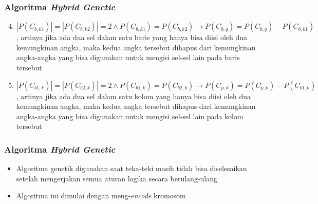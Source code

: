 \documentclass{beamer}
\begin{document}
\begin{frame}
\frametitle{Algoritma \textit{Hybrid Genetic}}
\begin{enumerate}
\setcounter{enumi}{3}
\item \begin{math}|P(C_{b,k1})| = |P(C_{b,k2})| = 2 \land P(C_{b,k1}) = P(C_{b,k2}) \rightarrow P(C_{b,q}) = P(C_{b,q}) - P(C_{b,k1})\end{math}, artinya jika ada dua sel dalam satu baris yang hanya bisa diisi oleh dua kemungkinan angka, maka kedua angka tersebut dihapus dari kemungkinan angka-angka yang bisa digunakan untuk mengisi sel-sel lain pada baris tersebut
\item \begin{math}|P(C_{b1,k})| = |P(C_{b2,k})| = 2 \land P(C_{b1,k}) = P(C_{b2,k}) \rightarrow P(C_{p,k}) = P(C_{p,k}) - P(C_{b1,k})\end{math}, artinya jika ada dua sel dalam satu kolom yang hanya bisa diisi oleh dua kemungkinan angka, maka kedua angka tersebut dihapus dari kemungkinan angka-angka yang bisa digunakan untuk mengisi sel-sel lain pada kolom tersebut
\end{enumerate}
\end{frame}


\begin{frame}
\frametitle{Algoritma \textit{Hybrid Genetic}}
\begin{itemize}
\item Algoritma genetik digunakan saat teka-teki masih tidak bisa diselesaikan setelah mengerjakan semua aturan logika secara berulang-ulang
\item Algoritma ini dimulai dengan meng-\textit{encode} kromosom
\end{itemize}
\end{frame}
\end{document}

